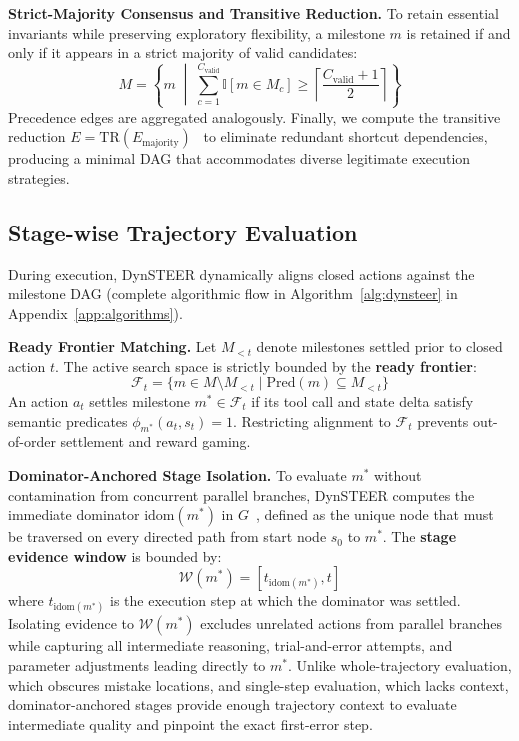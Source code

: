 \textbf{Strict-Majority Consensus and Transitive Reduction.} To retain essential invariants while preserving exploratory flexibility, a milestone $m$ is retained if and only if it appears in a strict majority of valid candidates:
\begin{equation}
    M = \left\{ m \;\middle|\; \sum_{c=1}^{C_{\text{valid}}} \mathbb{I}[m \in M_c] \ge \left\lceil \frac{C_{\text{valid}} + 1}{2} \right\rceil \right\}
    \label{eq:consensus}
\end{equation}
Precedence edges are aggregated analogously. Finally, we compute the transitive reduction $E = \text{TR}(E_{\text{majority}})$~\citep{tarjan1972depth} to eliminate redundant shortcut dependencies, producing a minimal DAG that accommodates diverse legitimate execution strategies.

\subsection{Stage-wise Trajectory Evaluation}
\label{sec:stage_alignment}
During execution, DynSTEER dynamically aligns closed actions against the milestone DAG (complete algorithmic flow in Algorithm~\ref{alg:dynsteer} in Appendix~\ref{app:algorithms}).

\textbf{Ready Frontier Matching.} Let $M_{<t}$ denote milestones settled prior to closed action $t$. The active search space is strictly bounded by the \textbf{ready frontier}:
\begin{equation}
    \mathcal{F}_t = \{ m \in M \setminus M_{<t} \mid \text{Pred}(m) \subseteq M_{<t} \}
    \label{eq:frontier}
\end{equation}
An action $a_t$ settles milestone $m^* \in \mathcal{F}_t$ if its tool call and state delta satisfy semantic predicates $\phi_{m^*}(a_t, s_t) = 1$. Restricting alignment to $\mathcal{F}_t$ prevents out-of-order settlement and reward gaming.

\textbf{Dominator-Anchored Stage Isolation.} To evaluate $m^*$ without contamination from concurrent parallel branches, DynSTEER computes the immediate dominator $\text{idom}(m^*)$ in $G$~\citep{lengauer1979fast}, defined as the unique node that must be traversed on every directed path from start node $s_0$ to $m^*$. The \textbf{stage evidence window} is bounded by:
\begin{equation}
    \mathcal{W}(m^*) = [t_{\text{idom}(m^*)}, t]
    \label{eq:stage_window}
\end{equation}
where $t_{\text{idom}(m^*)}$ is the execution step at which the dominator was settled. Isolating evidence to $\mathcal{W}(m^*)$ excludes unrelated actions from parallel branches while capturing all intermediate reasoning, trial-and-error attempts, and parameter adjustments leading directly to $m^*$. Unlike whole-trajectory evaluation, which obscures mistake locations, and single-step evaluation, which lacks context, dominator-anchored stages provide enough trajectory context to evaluate intermediate quality and pinpoint the exact first-error step.

